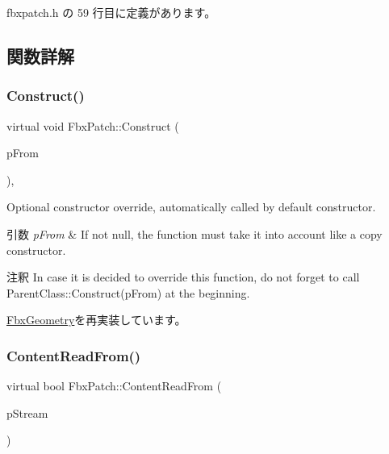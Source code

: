  fbxpatch.\+h の 59 行目に定義があります。



\subsection{関数詳解}
\mbox{\label{class_fbx_patch_a82fbbc0a7ec019bbe69c976ab755b23e}} 
\subsubsection{\texorpdfstring{Construct()}{Construct()}}
{\footnotesize\ttfamily virtual void Fbx\+Patch\+::\+Construct (\begin{DoxyParamCaption}\item[{const \hyperlink{class_fbx_object}{Fbx\+Object} $\ast$}]{p\+From }\end{DoxyParamCaption})\hspace{0.3cm}{\ttfamily [protected]}, {\ttfamily [virtual]}}

Optional constructor override, automatically called by default constructor. 
\begin{DoxyParams}{引数}
{\em p\+From} & If not null, the function must take it into account like a copy constructor. \\
\hline
\end{DoxyParams}
\begin{DoxyRemark}{注釈}
In case it is decided to override this function, do not forget to call Parent\+Class\+::\+Construct(p\+From) at the beginning. 
\end{DoxyRemark}


\hyperlink{class_fbx_geometry_a26ca96a86f17783c45ff83b33d2b5324}{Fbx\+Geometry}を再実装しています。

\mbox{\label{class_fbx_patch_ad1aac4a2e0e820f27ff9a0123ba5756e}} 
\subsubsection{\texorpdfstring{Content\+Read\+From()}{ContentReadFrom()}}
{\footnotesize\ttfamily virtual bool Fbx\+Patch\+::\+Content\+Read\+From (\begin{DoxyParamCaption}\item[{const \hyperlink{class_fbx_stream}{Fbx\+Stream} \&}]{p\+Stream }\end{DoxyParamCaption})\hspace{0.3cm}{\ttfamily [virtual]}}

